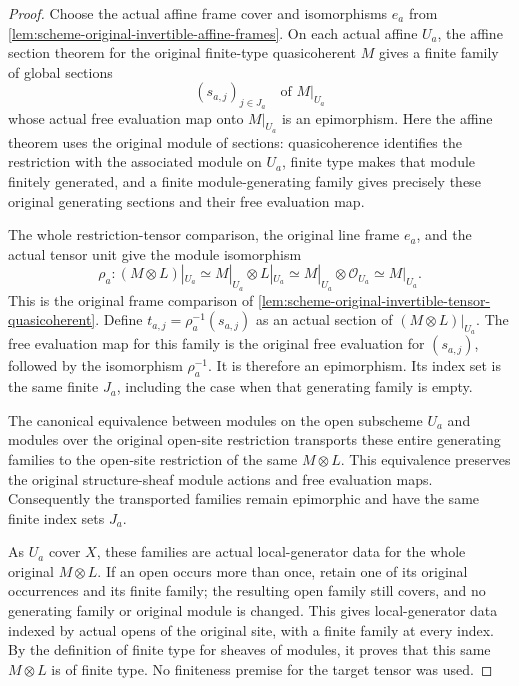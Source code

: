 \begin{proof}
Choose the actual affine frame cover and isomorphisms $e_a$ from
\ref{lem:scheme-original-invertible-affine-frames}. On each actual
affine $U_a$, the affine section theorem for the original finite-type
quasicoherent $M$ gives a finite family of global sections
\[
 (s_{a,j})_{j\in J_a}\quad\text{of }M|_{U_a}
\]
whose actual free evaluation map onto $M|_{U_a}$ is an epimorphism.
Here the affine theorem uses the original module of sections:
quasicoherence identifies the restriction with the associated
module on $U_a$, finite type makes that module finitely generated,
and a finite module-generating family gives precisely these
original generating sections and their free evaluation map.

The whole restriction-tensor comparison, the original line frame
$e_a$, and the actual tensor unit give the module isomorphism
\[
 \rho_a:(M\otimes L)|_{U_a}
       \simeq M|_{U_a}\otimes L|_{U_a}
       \simeq M|_{U_a}\otimes\mathcal O_{U_a}
       \simeq M|_{U_a}.
\]
This is the original frame comparison of
\ref{lem:scheme-original-invertible-tensor-quasicoherent}.
Define $t_{a,j}=\rho_a^{-1}(s_{a,j})$ as an actual section of
$(M\otimes L)|_{U_a}$. The free evaluation map for this family is
the original free evaluation for $(s_{a,j})$, followed by the
isomorphism $\rho_a^{-1}$. It is therefore an epimorphism.
Its index set is the same finite $J_a$, including the case when
that generating family is empty.

The canonical equivalence between modules on the open subscheme
$U_a$ and modules over the original open-site restriction transports
these entire generating families to the open-site restriction of
the same $M\otimes L$. This equivalence preserves the original
structure-sheaf module actions and free evaluation maps. Consequently
the transported families remain epimorphic and have the same finite
index sets $J_a$.

As $U_a$ cover $X$, these families are actual local-generator data
for the whole original $M\otimes L$. If an open occurs more than
once, retain one of its original occurrences and its finite family;
the resulting open family still covers, and no generating family
or original module is changed. This gives local-generator data
indexed by actual opens of the original site, with a finite family
at every index. By the definition of finite type for sheaves of
modules, it proves that this same $M\otimes L$ is of finite type.
No finiteness premise for the target tensor was used.
\end{proof}
